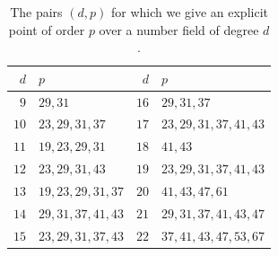 \begin{table}[H]
\centering
\begin{tabular}{rl@{\qquad}rl}
\toprule
$d$ & $p$ & $d$ & $p$\\
\midrule
$9$ & $29,31$ & $16$ & $29,31,37$\\
$10$ & $23,29,31,37$ & $17$ & $23,29,31,37,41,43$\\
$11$ & $19,23,29,31$ & $18$ & $41,43$\\
$12$ & $23,29,31,43$ & $19$ & $23,29,31,37,41,43$\\
$13$ & $19,23,29,31,37$ & $20$ & $41,43,47,61$\\
$14$ & $29,31,37,41,43$ & $21$ & $29,31,37,41,43,47$\\
$15$ & $23,29,31,37,43$ & $22$ & $37,41,43,47,53,67$\\
\bottomrule
\end{tabular}
\medskip
\caption{The pairs $(d,p)$ for which we give an explicit point of order $p$ over a number field of degree $d$.}
\label{table:examples}
\end{table}

